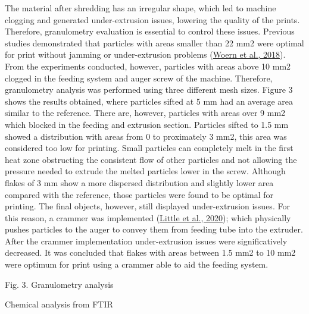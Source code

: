 \documentclass[
  12pt,
  number,
  review]{elsarticle}
\begin{document}
The material after shredding has an irregular shape, which led to
machine clogging and generated under-extrusion issues, lowering the
quality of the prints. Therefore, granulometry evaluation is essential
to control these issues. Previous studies demonstrated that particles
with areas smaller than 22 mm2 were optimal for print without jamming or
under-extrusion problems (\protect\hyperlink{ref-woern2018}{Woern et
al., 2018}). From the experiments conducted, however, particles with
areas above 10 mm2 clogged in the feeding system and auger screw of the
machine. Therefore, granulometry analysis was performed using three
different mesh sizes. Figure 3 shows the results obtained, where
particles sifted at 5 mm had an average area similar to the reference.
There are, however, particles with areas over 9 mm2 which blocked in the
feeding and extrusion section. Particles sifted to 1.5 mm showed a
distribution with areas from 0 to proximately 3 mm2, this area was
considered too low for printing. Small particles can completely melt in
the first heat zone obstructing the consistent flow of other particles
and not allowing the pressure needed to extrude the melted particles
lower in the screw. Although flakes of 3 mm show a more dispersed
distribution and slightly lower area compared with the reference, those
particles were found to be optimal for printing. The final objects,
however, still displayed under-extrusion issues. For this reason, a
crammer was implemented (\protect\hyperlink{ref-little2020}{Little et
al., 2020}); which physically pushes particles to the auger to convey
them from feeding tube into the extruder. After the crammer
implementation under-extrusion issues were significatively decreased. It
was concluded that flakes with areas between 1.5 mm2 to 10 mm2 were
optimum for print using a crammer able to aid the feeding system.

Fig. 3. Granulometry analysis

Chemical analysis from FTIR
\end{document}
